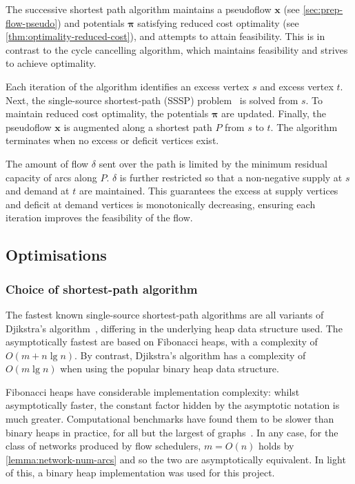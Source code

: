 The successive shortest path algorithm maintains a pseudoflow $\mathbf{x}$ (see \cref{sec:prep-flow-pseudo}) and potentials $\boldsymbol{\pi}$ satisfying reduced cost optimality (see \cref{thm:optimality-reduced-cost}), and attempts to attain feasibility. This is in contrast to the cycle cancelling algorithm, which maintains feasibility and strives to achieve optimality.

Each iteration of the algorithm identifies an excess vertex $s$ and excess vertex $t$. Next, the single-source shortest-path (SSSP) problem~\cite[ch.~24]{CLRS:2009} is solved from $s$. To maintain reduced cost optimality, the potentials $\boldsymbol{\pi}$ are updated. Finally, the pseudoflow $\mathbf{x}$ is augmented along a shortest path $P$ from $s$ to $t$. The algorithm terminates when no excess or deficit vertices exist.

The amount of flow $\delta$ sent over the path is limited by the minimum residual capacity of arcs along $P$. $\delta$ is further restricted so that a non-negative supply at $s$ and demand at $t$ are maintained. This guarantees the excess at supply vertices and deficit at demand vertices is monotonically decreasing, ensuring each iteration improves the feasibility of the flow.

\subsection{Optimisations} \label{sec:impl-ssp-optimisations}

\subsubsection{Choice of shortest-path algorithm}
The fastest known single-source shortest-path algorithms are all variants of Djikstra's algorithm~\cite[ch.~4]{Ahuja:1993}, differing in the underlying heap data structure used. The asymptotically fastest are based on Fibonacci heaps, with a complexity of $O(m + n\lg n)$. By contrast, Djikstra's algorithm has a complexity of $O(m\lg n)$ when using the popular binary heap data structure.

Fibonacci heaps have considerable implementation complexity: whilst asymptotically faster, the constant factor hidden by the asymptotic notation is much greater. Computational benchmarks have found them to be slower than binary heaps in practice, for all but the largest of graphs~\cite[p.~15]{KiralyKovacs:2012}. In any case, for the class of networks produced by flow schedulers, $m = O(n)$ holds by \cref{lemma:network-num-arcs} and so the two are asymptotically equivalent. In light of this, a binary heap implementation was used for this project.


